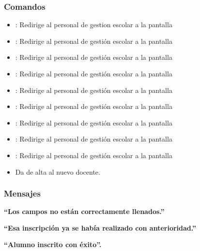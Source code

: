 \subsubsection{Comandos}
\begin{itemize}
	\item {}: Redirige al personal de gestion escolar a la pantalla 
	
	\item {}: Redirige al personal de gestión escolar a la pantalla 
	\item {}: Redirige al personal de gestión escolar a la pantalla 
	
	\item {}: Redirige al personal de gestión escolar a la pantalla 
	\item {}: Redirige al personal de gestión escolar a la pantalla 
	
	\item {}: Redirige al personal de gestión escolar a la pantalla 
	\item {}: Redirige al personal de gestión escolar a la pantalla 
	
	\item {}: Redirige al personal de gestión escolar a la pantalla 
	\item {}: Redirige al personal de gestión escolar a la pantalla 
	
	\item {} Da de alta al nuevo docente.
\end{itemize}

\subsubsection{Mensajes}
\begin{Citemize}
	\item {\bf ``Los campos no están correctamente llenados.''}
	\item {\bf ``Esa inscripción ya se había realizado con anterioridad.''}
	\item {\bf ``Alumno inscrito con éxito''.}
\end{Citemize}
